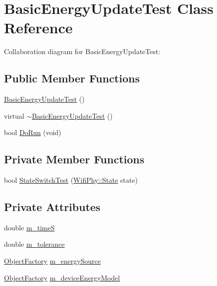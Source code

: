 \hypertarget{classBasicEnergyUpdateTest}{}\section{Basic\+Energy\+Update\+Test Class Reference}
\label{classBasicEnergyUpdateTest}


Collaboration diagram for Basic\+Energy\+Update\+Test\+:
\subsection*{Public Member Functions}
\begin{DoxyCompactItemize}
\item 
\hyperlink{classBasicEnergyUpdateTest_a516f4d592166c5641c912ea7205811ca}{Basic\+Energy\+Update\+Test} ()
\item 
virtual \hyperlink{classBasicEnergyUpdateTest_acaf0397b817c066a19c599f143346d2c}{$\sim$\+Basic\+Energy\+Update\+Test} ()
\item 
bool \hyperlink{classBasicEnergyUpdateTest_af778634c6ab82b59d238296fb6f078a4}{Do\+Run} (void)
\end{DoxyCompactItemize}
\subsection*{Private Member Functions}
\begin{DoxyCompactItemize}
\item 
bool \hyperlink{classBasicEnergyUpdateTest_aebdf7df054db21ed34826ccdf208f6a6}{State\+Switch\+Test} (\hyperlink{classns3_1_1WifiPhy_af97408fa76f99797497b492758467143}{Wifi\+Phy\+::\+State} state)
\end{DoxyCompactItemize}
\subsection*{Private Attributes}
\begin{DoxyCompactItemize}
\item 
double \hyperlink{classBasicEnergyUpdateTest_a4db29015c7b28c1b861621098e79cfe5}{m\+\_\+timeS}
\item 
double \hyperlink{classBasicEnergyUpdateTest_af476a051fd73ccab6996bd516fd4746b}{m\+\_\+tolerance}
\item 
\hyperlink{classns3_1_1ObjectFactory}{Object\+Factory} \hyperlink{classBasicEnergyUpdateTest_a6e597bf5827d66a852d1bac88278d648}{m\+\_\+energy\+Source}
\item 
\hyperlink{classns3_1_1ObjectFactory}{Object\+Factory} \hyperlink{classBasicEnergyUpdateTest_a8ae0adecca7e9f7d1db89ccb33dd5ae4}{m\+\_\+device\+Energy\+Model}
\end{DoxyCompactItemize}


